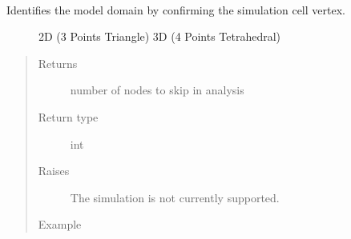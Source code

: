 \documentclass[letterpaper,10pt,english]{sphinxmanual}
\begin{document}
\begin{fulllineitems}
\begin{fulllineitems}
\begin{quote}
\begin{description}
\end{description}\end{quote}

\end{fulllineitems}


\begin{fulllineitems}
\label{\detokenize{openfdem:openfdem.openfdem.Model.model_domain}}~\begin{description}
\item[{Identifies the model domain by confirming the simulation cell vertex.}] \leavevmode
2D (3 Points \sphinxhyphen{} Triangle)
3D (4 Points \sphinxhyphen{} Tetrahedral)

\end{description}
\begin{quote}\begin{description}
\item[{Returns}] \leavevmode
number of nodes to skip in analysis

\item[{Return type}] \leavevmode
int

\item[{Raises}] \leavevmode
{} \textendash{} The simulation is not currently supported.

\item[{Example}] \leavevmode
\begin{sphinxVerbatim}[commandchars=\\\{\}]
   
  
\end{sphinxVerbatim}

\end{description}\end{quote}

\end{fulllineitems}


\end{fulllineitems}
\end{document}
